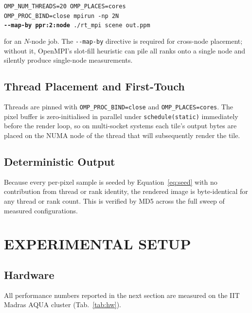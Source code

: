 \documentclass[twocolumn,10pt,cleanhead,cleanfoot]{asme2e}
\begin{document}
\noindent\texttt{\small OMP\_NUM\_THREADS=20 OMP\_PLACES=cores \\
OMP\_PROC\_BIND=close mpirun -np 2N \\
\textbf{-{}-map-by ppr:2:node} ./rt\_mpi scene out.ppm}

\noindent
for an $N$-node job. The \texttt{-{}-map-by} directive is required for cross-node placement; without it, OpenMPI's slot-fill heuristic can pile all ranks onto a single node and silently produce single-node measurements.

\subsection*{Thread Placement and First-Touch}
Threads are pinned with \texttt{OMP\_PROC\_BIND=close} and \texttt{OMP\_PLACES=cores}. The pixel buffer is zero-initialised in parallel under \texttt{schedule(static)} immediately before the render loop, so on multi-socket systems each tile's output bytes are placed on the NUMA node of the thread that will subsequently render the tile.

\subsection*{Deterministic Output}
Because every per-pixel sample is seeded by Equation~\eqref{eq:seed} with no contribution from thread or rank identity, the rendered image is byte-identical for any thread or rank count. This is verified by MD5 across the full sweep of measured configurations.

\section*{EXPERIMENTAL SETUP}

\subsection*{Hardware}
All performance numbers reported in the next section are measured on the IIT Madras AQUA cluster (Tab.~\ref{tab:hw}).
\end{document}
